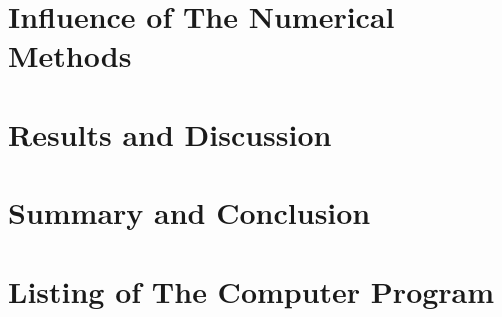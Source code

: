 \documentclass[11pt, a4paper]{article}
\begin{document}
\section{Influence of The Numerical Methods}

\section{Results and Discussion}

\section{Summary and Conclusion}

\newpage
\appendix
\section{Listing of The Computer Program}
\end{document}
